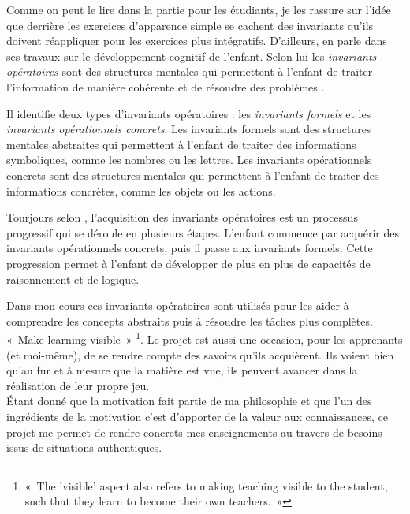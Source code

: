 Comme on peut le lire dans la partie pour les étudiants, je les rassure sur l'idée que derrière les exercices d'apparence simple se cachent des invariants qu'ils doivent réappliquer pour les exercices plus intégratifs. D'ailleurs, \citet{piaget1970structures} en parle dans ses travaux sur le développement cognitif de l'enfant. Selon lui les \emph{invariants opératoires} sont des structures mentales qui permettent à l'enfant de traiter l'information de manière cohérente et de résoudre des problèmes \cite{piaget1970structures}.

Il identifie deux types d'invariants opératoires : les \emph{invariants formels} et les \emph{invariants opérationnels concrets}. Les invariants formels sont des structures mentales abstraites qui permettent à l'enfant de traiter des informations symboliques, comme les nombres ou les lettres. Les invariants opérationnels concrets sont des structures mentales qui permettent à l'enfant de traiter des informations concrètes, comme les objets ou les actions.

Tourjours selon \citet{piaget1970structures}, l'acquisition des invariants opératoires est un processus progressif qui se déroule en plusieurs étapes. L'enfant commence par acquérir des invariants opérationnels concrets, puis il passe aux invariants formels. Cette progression permet à l'enfant de développer de plus en plus de capacités de raisonnement et de logique.

Dans mon cours ces invariants opératoires sont utilisés pour les  aider à comprendre les concepts abstraits puis à résoudre les tâches plus complètes.\\

«~Make learning visible~» \footnote{«~The 'visible' aspect also refers to making teaching visible to the student, such that they learn to become their own teachers.~»\cite{hattie2012visible}}\cite{hattie2012visible}. Le projet est aussi une occasion, pour les apprenants (et moi-même), de se rendre compte des savoirs qu'ils acquièrent. Ils voient bien qu'au fur et à mesure que la matière est vue, ils peuvent avancer dans la réalisation de leur propre jeu.\\
Étant donné que la motivation fait partie de ma philosophie et que l’un des ingrédients de la motivation c’est d’apporter de la valeur aux connaissances\cite{viau1994motivation}, ce projet me permet de rendre concrets mes enseignements au travers de besoins issus de situations authentiques.\\



